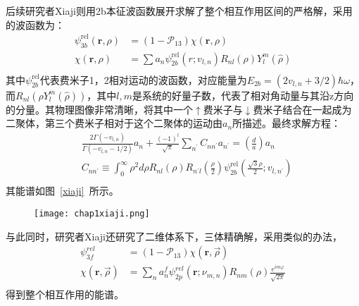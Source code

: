 后续研究者Xiaji则用2b本征波函数展开求解了整个相互作用区间的严格解，采用的波函数为：
\begin{equation}
\begin{split}
\psi_{3 b}^{\mathrm{rel}}(\mathbf{r}, \rho)&=\left(1-\mathcal{P}_{13}\right) \chi(\mathbf{r}, \rho)\\
\chi(\mathbf{r}, \rho)&=\sum a_{n} \psi_{2 b}^{\mathrm{rel}}\left(r ; v_{l, n}\right) R_{n l}(\rho) Y_{l}^{m}(\hat{\rho})\\
\end{split}
\end{equation}
其中$\psi_{2 b}^{\mathrm{rel}}$代表费米子1，2相对运动的波函数，对应能量为$E_{2b}=(2v_{l,n}+3/2)\hbar\omega$，而$R_{nl}(\rho Y^m_l(\hat{\rho}))$，其中$l,m$是系统的好量子数，代表了相对角动量与其沿z方向的分量。其物理图像非常清晰，将其中一个$\uparrow$费米子与$\downarrow$费米子结合在一起成为二聚体，第三个费米子相对于这个二聚体的运动由$a_n$所描述。最终求解方程：
\begin{equation}
\begin{split}
&\frac{2 \Gamma\left(-v_{l, n}\right)}{\Gamma\left(-v_{l, n}-1 / 2\right)} a_{n}+\frac{(-1)^{l}}{\sqrt{\pi}} \sum_{n^{\prime}} C_{n n^{\prime}} a_{n^{\prime}}=\left(\frac{d}{a}\right) a_{n}\\
&C_{n n^{\prime}} \equiv \int_{0}^{\infty} \rho^{2} d \rho R_{n l}(\rho) R_{n^{\prime} l}\left(\frac{\rho}{2}\right) \psi_{2 b}^{\mathrm{rel}}\left(\frac{\sqrt{3} \rho}{2} ; v_{l, n^{\prime}}\right)\\
\end{split}
\end{equation}
其能谱如图~\ref{xiaji}~所示。
\begin{figure}[!htbp]
    \centering
    \texttt{[image: chap1xiaji.png]}
    \label{xiaoji}
\end{figure}
与此同时，研究者Xiaji还研究了二维体系下，三体精确解，采用类似的办法，
\begin{equation}
\begin{split}
\psi_{3 f}^{r e l}&=\left(1-\mathcal{P}_{13}\right) \chi(\mathbf{r}, \vec{\rho})\\
\chi(\mathbf{r}, \vec{\rho})&=\sum_{n} a_{n}^{f} \psi_{2 p}^{r e l}\left(\mathbf{r} ; \nu_{m, n}\right) R_{n m}(\rho) \frac{e^{i m \varphi}}{\sqrt{2 \pi}}\\
\end{split}
\end{equation}
得到整个相互作用的能谱。

